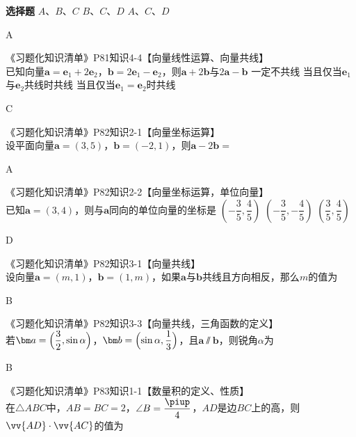 \begin{exercise}{\bf 选择题}
        {$A$、$B$、$C$}
        {$B$、$C$、$D$}
        {$A$、$C$、$D$}
      \begin{answer}
        A
      \end{answer}
    \item 《习题化知识清单》P81知识4-4【向量线性运算、向量共线】\\
      已知向量$\bm a=\bm e_1+2\bm e_2$，$\bm b=2\bm e_1-\bm e_2$，则$\bm a+2\bm b$与$2\bm a-\bm b$\xz
        {一定不共线}
        {当且仅当$\bm e_1$与$\bm e_2$共线时共线}
        {当且仅当$\bm e_1=\bm e_2$时共线}
      \begin{answer}
        C
      \end{answer}
    \item 《习题化知识清单》P82知识2-1【向量坐标运算】\\
      设平面向量$\bm a=(3,5)$，$\bm b=(-2,1)$，则$\bm a-2\bm b=$\xz
      \begin{answer}
        A
      \end{answer}
    \item 《习题化知识清单》P82知识2-2【向量坐标运算，单位向量】\\
      已知$\bm a=(3,4)$，则与$\bm a$同向的单位向量的坐标是\xz
       {$(-\dfrac{3}5,\dfrac{4}5)$}
       {$(-\dfrac{3}5,-\dfrac{4}5)$}
       {$(\dfrac{3}5,\dfrac{4}5)$}
      \begin{answer}
        D
      \end{answer}
    \item 《习题化知识清单》P82知识3-1【向量共线】\\
      设向量$\bm a=(m,1)$，$\bm b=(1,m)$，如果$\bm a$与$\bm b$共线且方向相反，那么$m$的值为\xz
      \begin{answer}
        B
      \end{answer}
    \item 《习题化知识清单》P82知识3-3【向量共线，三角函数的定义】\\
      若$\bm a=\Bigl(\dfrac{3}2,\sin\alpha\Bigr)$，$\bm b=\Bigl(\sin\alpha,\dfrac{1}3\Bigr)$，且$\bm a\varparallel \bm b$，则锐角$\alpha$为\xz
      \xx{30\degree}{45\degree}{60\degree}{75\degree}
      \begin{answer}
        B
      \end{answer}
    \item 《习题化知识清单》P83知识1-1【数量积的定义、性质】\\
      在$\triangle{ABC}$中，$AB=BC=2$，$\angle{B}=\dfrac{\piup}4$，$AD$是边$BC$上的高，则$\vv{AD}\cdot\vv{AC}$的值为\xz

\end{exercise}
